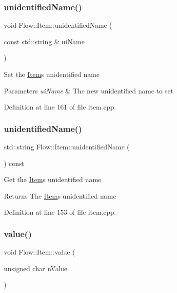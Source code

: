 \subsubsection{\texorpdfstring{unidentified\+Name()}{unidentifiedName()}\hspace{0.1cm}{\footnotesize\ttfamily [1/2]}}
{\footnotesize\ttfamily void Flow\+::\+Item\+::unidentified\+Name (\begin{DoxyParamCaption}\item[{const std\+::string \&}]{ui\+Name }\end{DoxyParamCaption})}

Set the \hyperlink{class_flow_1_1_item}{Item}\textquotesingle{}s unidentified name 
\begin{DoxyParams}{Parameters}
{\em ui\+Name} & The new unidentified name to set \\
\hline
\end{DoxyParams}


Definition at line 161 of file item.\+cpp.

\hypertarget{class_flow_1_1_item_a7686c3f072a62c2f97c70fe7b2b93f86}{}\label{class_flow_1_1_item_a7686c3f072a62c2f97c70fe7b2b93f86} 
\subsubsection{\texorpdfstring{unidentified\+Name()}{unidentifiedName()}\hspace{0.1cm}{\footnotesize\ttfamily [2/2]}}
{\footnotesize\ttfamily std\+::string Flow\+::\+Item\+::unidentified\+Name (\begin{DoxyParamCaption}{ }\end{DoxyParamCaption}) const}

Get the \hyperlink{class_flow_1_1_item}{Item}\textquotesingle{}s unidentified name \begin{DoxyReturn}{Returns}
The \hyperlink{class_flow_1_1_item}{Item}\textquotesingle{}s unidentified name 
\end{DoxyReturn}


Definition at line 153 of file item.\+cpp.

\hypertarget{class_flow_1_1_item_a0c903b70ce7ddd19ee2c117de443bc30}{}\label{class_flow_1_1_item_a0c903b70ce7ddd19ee2c117de443bc30} 
\subsubsection{\texorpdfstring{value()}{value()}\hspace{0.1cm}{\footnotesize\ttfamily [1/2]}}
{\footnotesize\ttfamily void Flow\+::\+Item\+::value (\begin{DoxyParamCaption}\item[{unsigned char}]{n\+Value }\end{DoxyParamCaption})}

